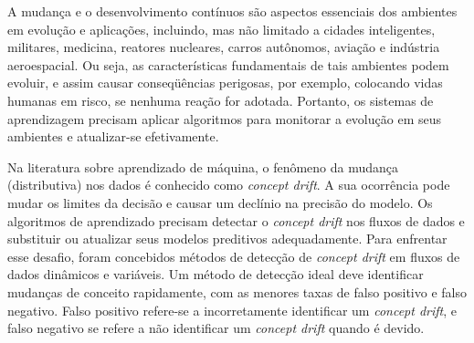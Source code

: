 \documentclass[qual, classic, a4paper]{ufbathesis}
\begin{document}

\vspace{1cm}

A mudança e o desenvolvimento contínuos são aspectos essenciais dos ambientes em evolução e
aplicações, incluindo, mas não limitado a cidades inteligentes, militares, medicina, reatores nucleares,
carros autônomos, aviação e indústria aeroespacial. Ou seja, as características fundamentais de tais
ambientes podem evoluir, e assim causar conseqüências perigosas, por exemplo, colocando vidas humanas em risco, se nenhuma reação for adotada. Portanto, os sistemas de aprendizagem precisam aplicar
algoritmos para monitorar a evolução em seus ambientes e atualizar-se efetivamente.

Na literatura sobre aprendizado de máquina, o fenômeno da mudança (distributiva) nos dados
é conhecido como \textit{concept drift}. A sua ocorrência pode mudar os limites da decisão e causar um declínio
na precisão do modelo. Os algoritmos de aprendizado precisam detectar o \textit{concept drift} nos fluxos de dados e substituir ou atualizar seus modelos preditivos adequadamente. Para enfrentar esse desafio, foram concebidos métodos de detecção de \textit{concept drift} em fluxos de dados dinâmicos e variáveis. Um método de detecção ideal deve identificar mudanças de conceito rapidamente, com as menores taxas de falso positivo e falso negativo.
Falso positivo refere-se a incorretamente identificar um \textit{concept drift}, e falso negativo se refere a não
identificar um \textit{concept drift} quando é devido.
\end{document}
